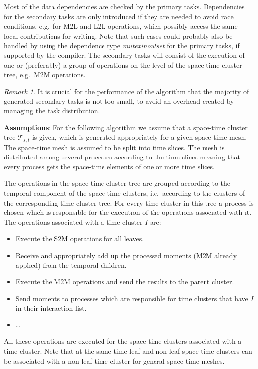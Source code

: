 \documentclass[a4paper,11pt]{article}
\theoremstyle{plain}
\theoremstyle{definition}
\theoremstyle{remark}
\newtheorem{remark}[thm]{Remark}
\begin{document}
Most of the data dependencies are checked by the primary tasks. Dependencies for the secondary tasks are only 
introduced if they are needed to avoid race conditions, e.g.~for M2L and L2L operations, which possibly access the same 
local contributions for writing. Note that such cases could probably also be handled by using the dependence type 
\textit{mutexinoutset} for the primary tasks, if supported by the compiler. The secondary tasks will consist of the
execution of one or (preferably) a group of operations on the level of the space-time cluster tree, e.g.~M2M operations.

\begin{remark}
  It is crucial for the performance of the algorithm that the majority of generated secondary tasks is not too small, 
  to avoid an overhead created by managing the task distribution. 
\end{remark}

\textbf{Assumptions}: For the following algorithm we assume that a space-time cluster tree $\mathcal{T}_{s,t}$ is 
given, which is generated appropriately for a given space-time mesh. The space-time mesh is assumed to be split into 
time slices. The mesh is distributed among several processes according to the time slices meaning that every process 
gets the space-time elements of one or more time slices. 

The operations in the space-time cluster tree are grouped according to the temporal component of the space-time
clusters, i.e.~according to the clusters of the corresponding time cluster tree. For every time cluster in this tree a
process is chosen which is responsible for the execution of the operations associated with it. The operations associated
with a time cluster $I$ are:
\begin{itemize}
  \item Execute the S2M operations for all leaves.
  \item Receive and appropriately add up the processed moments (M2M already applied) from the temporal children.
  \item Execute the M2M operations and send the results to the parent cluster.
  \item Send moments to processes which are responsible for time clusters that have $I$ in their interaction list.
  \item \ldots
\end{itemize}
All these operations are executed for the space-time clusters associated with a time cluster. Note that at the same
time leaf and non-leaf space-time clusters can be associated with a non-leaf time cluster for general space-time 
meshes.
\end{document}
